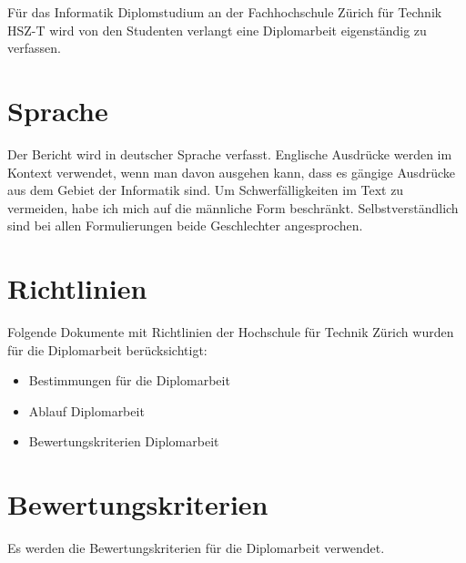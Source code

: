   Für das Informatik Diplomstudium an der Fachhochschule Zürich für Technik
  HSZ-T wird von den Studenten verlangt eine Diplomarbeit eigenständig zu
  verfassen.
  
  \section{Sprache}
  
  Der Bericht wird in deutscher Sprache verfasst. Englische Ausdrücke werden im
  Kontext verwendet, wenn man davon ausgehen kann, dass es gängige Ausdrücke aus
  dem Gebiet der Informatik sind. Um Schwerfälligkeiten im Text zu vermeiden,
  habe ich mich auf die männliche Form beschränkt. Selbstverständlich sind bei
  allen Formulierungen beide Geschlechter angesprochen.
    
  \section{Richtlinien}
  Folgende Dokumente mit Richtlinien der Hochschule für Technik Zürich wurden
  für die Diplomarbeit berücksichtigt:

  \begin{itemize}
      \item Bestimmungen für die Diplomarbeit \cite{hsz_reglement}
      \item Ablauf Diplomarbeit \cite{hsz_ablauf}
      \item Bewertungskriterien Diplomarbeit \cite{hsz_bewertungskriterien}
  \end{itemize} 
    
  \section{Bewertungskriterien}
  
  Es werden die Bewertungskriterien für die
  Diplomarbeit\cite{hsz_bewertungskriterien} verwendet.